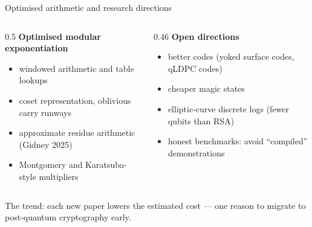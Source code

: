 \documentclass[aspectratio=169,11pt]{beamer}
\newcommand{\key}[1]{{\color{qdark}\textbf{#1}}}
\begin{document}
\begin{frame}[label=fResearch]{Optimised arithmetic and research directions}
  \small
  \begin{columns}[T]
    \begin{column}{0.5\textwidth}
      \key{Optimised modular exponentiation}
      \begin{itemize}\itemsep1pt
        \item windowed arithmetic and table lookups
        \item coset representation, oblivious carry runways
        \item approximate residue arithmetic (Gidney 2025)
        \item Montgomery and Karatsuba-style multipliers
      \end{itemize}
    \end{column}
    \begin{column}{0.46\textwidth}
      \key{Open directions}
      \begin{itemize}\itemsep1pt
        \item better codes (yoked surface codes, qLDPC codes)
        \item cheaper magic states
        \item elliptic-curve discrete logs (fewer qubits than RSA)
        \item honest benchmarks: avoid ``compiled'' demonstrations
      \end{itemize}
    \end{column}
  \end{columns}
  \vspace{4pt}
  \centering\color{qgrey} The trend: each new paper lowers the estimated cost --- one reason to migrate to post-quantum cryptography early.
\end{frame}

\end{document}
